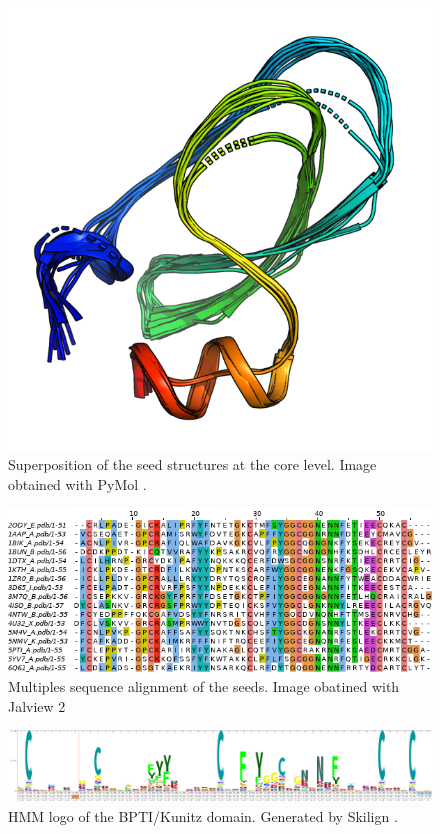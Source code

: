 \documentclass[nocrop]{bioinfo}
\begin{document}
\begin{figure}[h]
	\centering
    \includegraphics[width=.8\columnwidth]{kunitz_nohelix_cropped}
    \caption{Superposition of the seed structures at the core level. Image obtained with PyMol \citep{pymol2015}.}
    \label{fig:seed}
\end{figure}

\begin{figure}[!tbp]
    \includegraphics[width=\columnwidth]{msa}
    \caption{Multiples sequence alignment of the seeds. Image obatined with Jalview 2 \citep{jalview2009}}
    \label{fig:ali}
\end{figure}

\begin{figure}[!t]
    \includegraphics[width=\textwidth]{onlyxray_logo}
    \caption{HMM logo of the BPTI/Kunitz domain. Generated by Skilign \citep{skylign2014}.}
    \label{fig:logo}
\end{figure}
\end{document}
